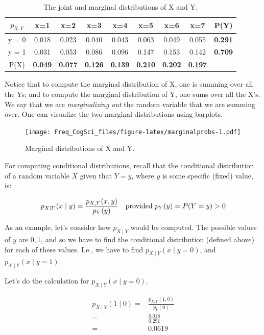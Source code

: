 \documentclass[
  12pt,
]{krantz}
\theoremstyle{definition}
\theoremstyle{definition}
\theoremstyle{definition}
\theoremstyle{definition}
\theoremstyle{remark}
\begin{document}
\small
\begin{table}[!htbp]
\begin{center}
\begin{tabular}{c|ccccccc|c}
$p_{X,Y}$ & x=1 & x=2 & x=3 & x=4 & x=5 & x=6 & x=7 & P(Y)\\
\hline
y = 0 & 0.018 & 0.023 & 0.040 & 0.043 & 0.063 & 0.049 & 0.055 &  \textbf{0.291}\\
y = 1 & 0.031 & 0.053 & 0.086 & 0.096 &  0.147 & 0.153 &  0.142 &  \textbf{0.709}\\
\hline
P(X) & \textbf{0.049} & \textbf{0.077} & \textbf{0.126} & \textbf{0.139} & \textbf{0.210} & \textbf{0.202} & \textbf{0.197}\\
\end{tabular}
\end{center}
\caption{The joint and marginal distributions of X and Y.}\label{discretebivartable2}
\end{table}
\normalsize

Notice that to compute the marginal distribution of X, one is summing over all the Ys; and to compute the marginal distribution of Y, one sums over all the X's. We say that we are \emph{marginalizing out} the random variable that we are summing over. One can visualize the two marginal distributions using barplots.

\begin{figure}
\centering
\texttt{[image: Freq\_CogSci\_files/figure-latex/marginalprobs-1.pdf]}
\caption{\label{fig:marginalprobs}Marginal distributions of X and Y.}
\end{figure}

For computing conditional distributions, recall that the conditional distribution of a random variable \(X\) given that \(Y=y\), where \(y\) is some specific (fixed) value, is:

\begin{equation}
p_{X\mid Y} (x\mid y) = \frac{p_{X,Y}(x,y)}{p_Y(y)} \quad \hbox{provided } p_Y(y)=P(Y=y)>0
\end{equation}

As an example, let's consider how \(p_{X\mid Y}\) would be computed.
The possible values of \(y\) are \(0,1\), and so we have to find the conditional distribution (defined above) for each of these values. I.e., we have to find \(p_{X\mid Y}(x\mid y=0)\), and \(p_{X\mid Y}(x\mid y=1)\).

Let's do the calculation for \(p_{X\mid Y}(x\mid y=0)\).

\begin{equation}
\begin{split}
p_{X\mid Y} (1\mid 0) =& \frac{p_{X,Y}(1,0)}{p_Y(0)}\\
    =&  \frac{0.018}{0.291}\\
    =& 0.0619
\end{split} 
\end{equation}
\end{document}
